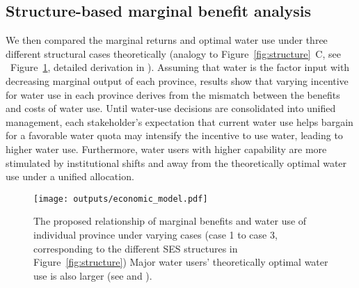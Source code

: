 \subsection{Structure-based marginal benefit analysis}
\label{result-4}
We then compared the marginal returns and optimal water use under three different structural cases theoretically (analogy to Figure~\ref{fig:structure}~C, see ~Figure~\ref{fig:model}, detailed derivation in \textit{}).
Assuming that water is the factor input with decreasing marginal output of each province, results show that varying incentive for water use in each province derives from the mismatch between the benefits and costs of water use.
Until water-use decisions are consolidated into unified management, each stakeholder’s expectation that current water use helps bargain for a favorable water quota may intensify the incentive to use water, leading to higher water use.
Furthermore, water users with higher capability are more stimulated by institutional shifts and away from the theoretically optimal water use under a unified allocation.

\begin{figure}[!ht]
    \centering
    \texttt{[image: outputs/economic\_model.pdf]}
	\caption{
		The proposed relationship of marginal benefits and water use of individual province under varying cases (case 1 to case 3, corresponding to the different SES structures in Figure~\ref{fig:structure}) Major water users' theoretically optimal water use is also larger (see  and \textit{}).}
	\label{fig:model}
\end{figure}
